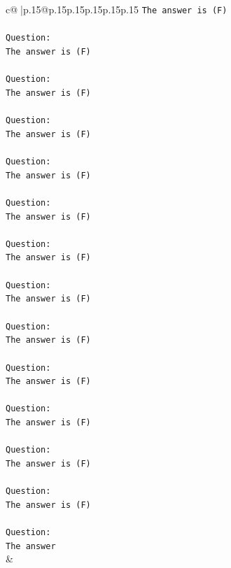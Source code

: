 \documentclass{article}
\begin{document}
{\begin{supertabular}{c@{$\;$}|p{.15\linewidth}@{}p{.15\linewidth}p{.15\linewidth}p{.15\linewidth}p{.15\linewidth}p{.15\linewidth}}
{{{\texttt{The answer is (F)} \\
\\ 
\texttt{Question:} \\
\texttt{The answer is (F)} \\
\\ 
\texttt{Question:} \\
\texttt{The answer is (F)} \\
\\ 
\texttt{Question:} \\
\texttt{The answer is (F)} \\
\\ 
\texttt{Question:} \\
\texttt{The answer is (F)} \\
\\ 
\texttt{Question:} \\
\texttt{The answer is (F)} \\
\\ 
\texttt{Question:} \\
\texttt{The answer is (F)} \\
\\ 
\texttt{Question:} \\
\texttt{The answer is (F)} \\
\\ 
\texttt{Question:} \\
\texttt{The answer is (F)} \\
\\ 
\texttt{Question:} \\
\texttt{The answer is (F)} \\
\\ 
\texttt{Question:} \\
\texttt{The answer is (F)} \\
\\ 
\texttt{Question:} \\
\texttt{The answer is (F)} \\
\\ 
\texttt{Question:} \\
\texttt{The answer is (F)} \\
\\ 
\texttt{Question:} \\
\texttt{The answer} \\
            }
        }
    }
    & \\ \\

\end{supertabular}
}
\end{document}
